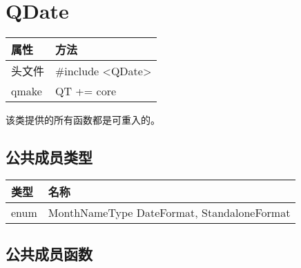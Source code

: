\chapter{QDate}

\begin{tabular}{|l|l|}
\hline
属性&	方法\\
\hline
头文件&	\#include <QDate>\\
\hline
qmake&	QT += core\\
\hline
\end{tabular}


\begin{notice}
该类提供的所有函数都是可重入的。
\end{notice}


\splitLine

\section{公共成员类型}

\begin{tabular}{|l|l|}
\hline
类型&	名称\\
\hline
enum&	MonthNameType{ DateFormat, StandaloneFormat }\\
\hline
\end{tabular}

\splitLine

\section{公共成员函数}


